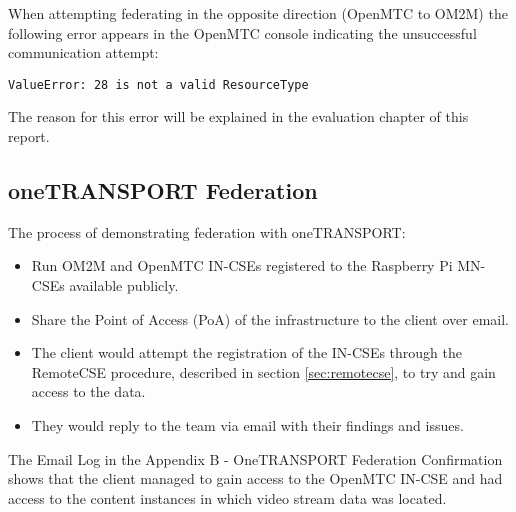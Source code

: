 When attempting federating in the opposite direction (OpenMTC to OM2M) the following error appears in the OpenMTC console indicating the unsuccessful communication attempt:\\

\begin{lstlisting}[caption={Failed federation error}, label={lst:federation-error}]
ValueError: 28 is not a valid ResourceType
\end{lstlisting}

The reason for this error will be explained in the evaluation chapter of this report.
       
\subsection{oneTRANSPORT Federation}

The process of demonstrating federation with oneTRANSPORT: 

\begin{itemize}
  \item Run OM2M and OpenMTC IN-CSEs registered to the Raspberry Pi MN-CSEs available publicly. 
  \item Share the Point of Access (PoA) of the infrastructure to the client over email.
  \item The client would attempt the registration of the IN-CSEs through the RemoteCSE procedure, described in section \ref{sec:remotecse}, to try and gain access to the data.
  \item They would reply to the team via email with their findings and issues.
\end{itemize}

The Email Log in the Appendix B - OneTRANSPORT Federation Confirmation shows that the client managed to gain access to the OpenMTC IN-CSE and had access to the content instances in which video stream data was located. 

\clearpage
